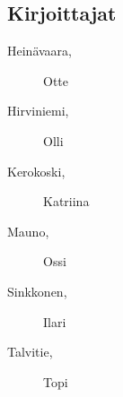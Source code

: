 \subsection*{Kirjoittajat}
\begin{description}
 \item[Heinävaara, ] Otte
 \item[Hirviniemi, ] Olli
 \item[Kerokoski, ] Katriina
 \item[Mauno, ] Ossi
 \item[Sinkkonen, ] Ilari
 \item[Talvitie, ] Topi
\end{description}
